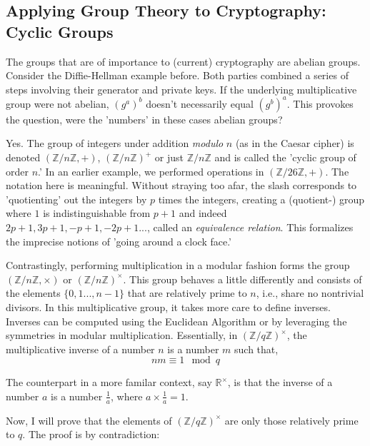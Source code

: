 \documentclass[11pt, a4paper]{report}
\newcommand{\integers}{\mathbb{Z}}
\newcommand{\reals}{\mathbb{R}}
\begin{document}
\subsection{Applying Group Theory to Cryptography: Cyclic Groups}

  The groups that are of importance to (current) cryptography are abelian groups. Consider the Diffie-Hellman example before. Both parties combined a series of steps involving their generator and private keys. If the underlying multiplicative group were not abelian, $(g^a)^b$ doesn't necessarily equal $(g^b)^a$. This provokes the question, were the 'numbers' in these cases abelian groups?
 
 Yes. The group of integers under addition \textit{modulo} $n$ (as in the Caesar cipher) is denoted $(\integers / n \integers, +)$, $(\integers / n \integers)^{+}$ or just $\integers / n \integers$  and is called the 'cyclic group of order $n$.' In an earlier example, we performed operations in $(\integers / 26 \integers, +)$. The notation here is meaningful. Without straying too afar, the slash corresponds to 'quotienting' out the integers by $p$ times the integers, creating a (quotient-) group where $1$ is indistinguishable from $p+1$ and indeed $2p+1, 3p+1, -p+1, -2p+1...$, called an \textit{equivalence relation}.\autocite[104]{saracino} This formalizes the imprecise notions of 'going around a clock face.'
  
  Contrastingly, performing multiplication in a modular fashion forms the group $(\integers / n \integers, \times)$ or $(\integers / n \integers)^{\times}$. This group behaves a little differently and consists of the elements $\lbrace 0, 1 ...,n-1\rbrace$ that are relatively prime to $n$, i.e., share no nontrivial divisors. In this multiplicative group, it takes more care to define inverses. Inverses can be computed using the Euclidean Algorithm or by leveraging the symmetries in modular multiplication.\autocite[36]{saracino} Essentially, in $(\integers / q \integers)^{\times}$, the multiplicative inverse of a number $n$ is a number $m$ such that,
\[ nm \equiv 1 \mod q\]

The counterpart in a more familar context, say $\reals^{\times}$, is that the inverse of a number $a$ is a number $\frac{1}{a}$, where $a \times \frac{1}{a} = 1$.

Now, I will prove that the elements of $(\integers / q \integers)^{\times}$ are only those relatively prime to $q$. The proof is by contradiction:
\end{document}
